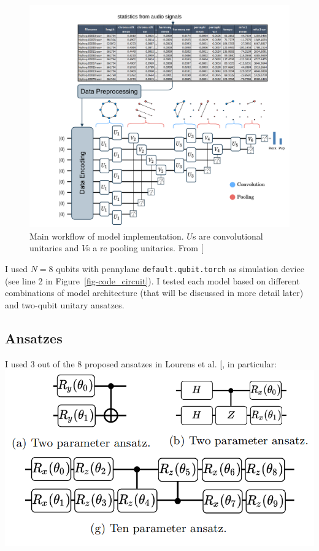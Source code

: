 \documentclass[
  13pt,
  a4paper,
  DIV=11,
  numbers=noendperiod,
  oneside]{scrreprt}
\begin{document}
\begin{figure}[H]

{\centering \includegraphics{chapters/../img/workflow.png}

}

\caption{Main workflow of model implementation. \(U\)s are convolutional
unitaries and \(V\)s a re pooling unitaries. From
{[}\citeproc{ref-lourens2023hierarchical}{1}{]}}

\end{figure}%

I used \(N = 8\) qubits with pennylane \texttt{default.qubit.torch} as
simulation device (see line 2 in Figure~\ref{fig-code_circuit}). I
tested each model based on different combinations of model architecture
(that will be discussed in more detail later) and two-qubit unitary
ansatzes.

\subsection{Ansatzes}\label{ansatzes}

I used 3 out of the 8 proposed ansatzes in Lourens et al.
{[}\citeproc{ref-lourens2023hierarchical}{1}{]}, in particular:
\includegraphics{chapters/../img/ansatzes_conv.png}
\end{document}
